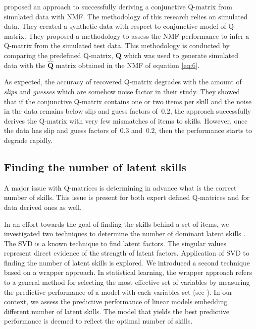 \citet{desmarais2012mapping} proposed an approach to successfully deriving a conjunctive Q-matrix from simulated data with NMF. The methodology of this research relies on simulated data. They created a synthetic data with respect to conjunctive model of Q-matrix. They proposed a methodology to assess the NMF performance to infer a Q-matrix from the simulated test data. This methodology is conducted by comparing the predefined Q-matrix, $\mathbf{Q}$ which was used to generate simulated data with the $\hat{\mathbf{Q}}$ matrix obtained in the NMF of equation \ref{eq:6}.

As expected, the accuracy of recovered Q-matrix degrades with the amount of \textit{slips} and \textit{guesses} which are somehow noise factor in their study. They showed that if the conjunctive Q-matrix contains one or two items per skill and the noise in the data remains below slip and guess factors of~$0.2$, the approach successfully derives the Q-matrix with very few mismatches of items to skills. However, once the data has slip and guess factors of~$0.3$ and~$0.2$, then the performance starts to degrade rapidly.

\subsection{Finding the number of latent skills}
\label{EDM2012}


A major issue with Q-matrices is determining in advance what is the correct number of skills.  This issue is present for both expert defined Q-matrices and for data derived ones as well.

In an effort towards the goal of finding the skills behind a set of items, we  investigated two techniques to determine the number of dominant latent skills \citep{Beheshti2012Numbers}. The SVD is a known technique to find latent factors. The singular values represent direct evidence of the strength of latent factors. Application of SVD to finding the number of latent skills is explored. We introduced a second technique based on a wrapper approach. In statistical learning, the wrapper approach refers to a general method for selecting the most effective set of variables by measuring the predictive performance of a model with each variables set (see \citet{Guyon2003}). In our context, we assess the predictive performance of linear models embedding different number of latent skills. The model that yields the best predictive performance is deemed to reflect the optimal number of skills.


